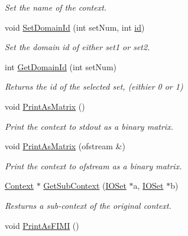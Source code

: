 \begin{DoxyCompactItemize}
\begin{DoxyCompactList}\small\item\em Set the name of the context. \item\end{DoxyCompactList}\item 
void \hyperlink{class_context_ac7eb147a11e84e49cda654ecc3812fe5}{SetDomainId} (int setNum, int \hyperlink{class_context_a134a1f80c8256db2afdb6d6f3096e0d6}{id})
\begin{DoxyCompactList}\small\item\em Set the domain id of either set1 or set2. \item\end{DoxyCompactList}\item 
\hypertarget{class_context_aaa470e3eb23649e665329a5764a16019}{
int \hyperlink{class_context_aaa470e3eb23649e665329a5764a16019}{GetDomainId} (int setNum)}
\label{class_context_aaa470e3eb23649e665329a5764a16019}

\begin{DoxyCompactList}\small\item\em Returns the id of the selected set, (eithier 0 or 1) \item\end{DoxyCompactList}\item 
\hypertarget{class_context_af7785111a88d3e31d7168e3f9aed2759}{
void \hyperlink{class_context_af7785111a88d3e31d7168e3f9aed2759}{PrintAsMatrix} ()}
\label{class_context_af7785111a88d3e31d7168e3f9aed2759}

\begin{DoxyCompactList}\small\item\em Print the context to stdout as a binary matrix. \item\end{DoxyCompactList}\item 
\hypertarget{class_context_aac2e8802d5547c971735b1e1b496c90f}{
void \hyperlink{class_context_aac2e8802d5547c971735b1e1b496c90f}{PrintAsMatrix} (ofstream \&)}
\label{class_context_aac2e8802d5547c971735b1e1b496c90f}

\begin{DoxyCompactList}\small\item\em Print the context to ofstream as a binary matrix. \item\end{DoxyCompactList}\item 
\hyperlink{class_context}{Context} $\ast$ \hyperlink{class_context_a8bfdcf16db7537122236cab328358e8d}{GetSubContext} (\hyperlink{class_i_o_set}{IOSet} $\ast$a, \hyperlink{class_i_o_set}{IOSet} $\ast$b)
\begin{DoxyCompactList}\small\item\em Resturns a sub-\/context of the original context. \item\end{DoxyCompactList}\item 
\hypertarget{class_context_a1ce45f00711d65af754a964a2b41623d}{
void \hyperlink{class_context_a1ce45f00711d65af754a964a2b41623d}{PrintAsFIMI} ()}
\label{class_context_a1ce45f00711d65af754a964a2b41623d}


\end{DoxyCompactItemize}
